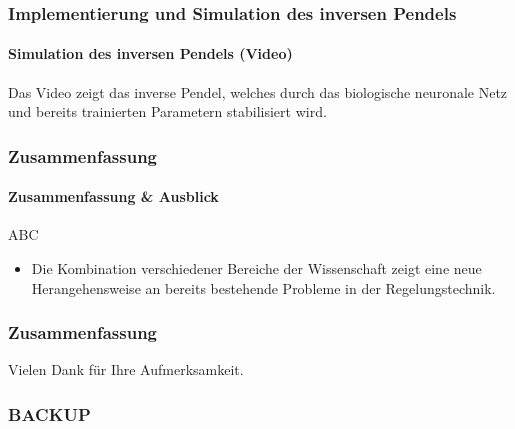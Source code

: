 \documentclass[10pt,t,aspectratio=1610]{beamer}
\newcommand{\ChapterCartpole}{Implementierung und Simulation des inversen Pendels}
\newcommand{\ChapterEnd}{Zusammenfassung}
\newcommand{\ChapterBackup}{BACKUP}
\begin{document}

\begin{frame}
	\frametitle{\ChapterCartpole}
	\framesubtitle{Simulation des inversen Pendels (Video)}
	\vspace{0.3cm}
	Das Video zeigt das inverse Pendel, welches durch das biologische neuronale Netz und bereits trainierten Parametern stabilisiert wird.\\
	\vspace{0.3cm}
		\centering

\end{frame}


\begin{frame}
	\frametitle{\ChapterEnd}
	\framesubtitle{Zusammenfassung \& Ausblick}
	\vspace{0.3cm}
	ABC
	\vspace{0.1cm}
	\begin{itemize}
		\item Die Kombination verschiedener Bereiche der Wissenschaft zeigt eine neue Herangehensweise an bereits bestehende Probleme in der Regelungstechnik.
	\end{itemize}

\end{frame}


\begin{frame}[c]
	\frametitle{\ChapterEnd}
	\centering
	{\LARGE Vielen Dank für Ihre Aufmerksamkeit.}

\end{frame}


\begin{frame}[c]
\frametitle{\ChapterBackup}
\centering
{\Large {}}

\end{frame}

\end{document}
